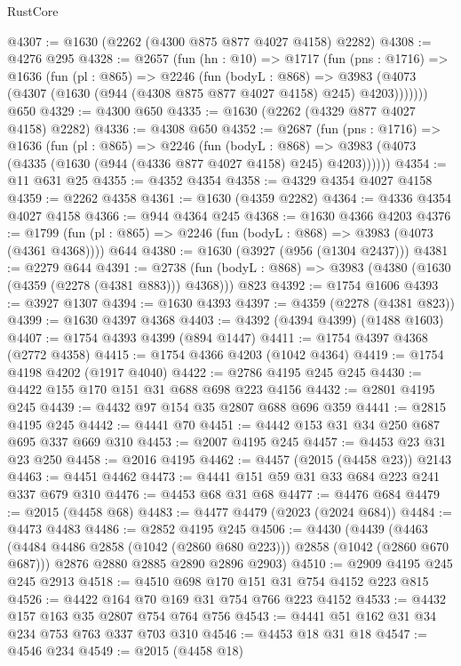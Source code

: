 \begin{lexlean}{RustCore}
\begin{coremodule}
@4307 := @1630 (@2262 (@4300 @875 @877 @4027 @4158) @2282)
@4308 := @4276 @295
@4328 := @2657
    (fun (hn : @10) =>
    @1717
      (fun (pns : @1716) =>
      @1636
        (fun (pl : @865) =>
        @2246
          (fun (bodyL : @868) =>
          @3983 (@4073 (@4307 (@1630 (@944 (@4308 @875 @877 @4027 @4158) @245) @4203)))))))
    @650
@4329 := @4300 @650
@4335 := @1630 (@2262 (@4329 @877 @4027 @4158) @2282)
@4336 := @4308 @650
@4352 := @2687
    (fun (pns : @1716) =>
    @1636
      (fun (pl : @865) =>
      @2246
        (fun (bodyL : @868) =>
        @3983 (@4073 (@4335 (@1630 (@944 (@4336 @877 @4027 @4158) @245) @4203))))))
@4354 := @11 @631 @25
@4355 := @4352 @4354
@4358 := @4329 @4354 @4027 @4158
@4359 := @2262 @4358
@4361 := @1630 (@4359 @2282)
@4364 := @4336 @4354 @4027 @4158
@4366 := @944 @4364 @245
@4368 := @1630 @4366 @4203
@4376 := @1799 (fun (pl : @865) => @2246 (fun (bodyL : @868) => @3983 (@4073 (@4361 @4368)))) @644
@4380 := @1630 (@3927 (@956 (@1304 @2437)))
@4381 := @2279 @644
@4391 := @2738 (fun (bodyL : @868) => @3983 (@4380 (@1630 (@4359 (@2278 (@4381 @883))) @4368))) @823
@4392 := @1754 @1606
@4393 := @3927 @1307
@4394 := @1630 @4393
@4397 := @4359 (@2278 (@4381 @823))
@4399 := @1630 @4397 @4368
@4403 := @4392 (@4394 @4399) (@1488 @1603)
@4407 := @1754 @4393 @4399 (@894 @1447)
@4411 := @1754 @4397 @4368 (@2772 @4358)
@4415 := @1754 @4366 @4203 (@1042 @4364)
@4419 := @1754 @4198 @4202 (@1917 @4040)
@4422 := @2786 @4195 @245 @245
@4430 := @4422 @155 @170 @151 @31 @688 @698 @223 @4156
@4432 := @2801 @4195 @245
@4439 := @4432 @97 @154 @35 @2807 @688 @696 @359
@4441 := @2815 @4195 @245
@4442 := @4441 @70
@4451 := @4442 @153 @31 @34 @250 @687 @695 @337 @669 @310
@4453 := @2007 @4195 @245
@4457 := @4453 @23 @31 @23 @250
@4458 := @2016 @4195
@4462 := @4457 (@2015 (@4458 @23)) @2143
@4463 := @4451 @4462
@4473 := @4441 @151 @59 @31 @33 @684 @223 @241 @337 @679 @310
@4476 := @4453 @68 @31 @68
@4477 := @4476 @684
@4479 := @2015 (@4458 @68)
@4483 := @4477 @4479 (@2023 (@2024 @684))
@4484 := @4473 @4483
@4486 := @2852 @4195 @245
@4506 := @4430
    (@4439
      (@4463 (@4484 @4486 @2858 (@1042 (@2860 @680 @223))) @2858 (@1042 (@2860 @670 @687)))
      @2876
      @2880
      @2885
      @2890
      @2896
      @2903)
@4510 := @2909 @4195 @245 @245 @2913
@4518 := @4510 @698 @170 @151 @31 @754 @4152 @223 @815
@4526 := @4422 @164 @70 @169 @31 @754 @766 @223 @4152
@4533 := @4432 @157 @163 @35 @2807 @754 @764 @756
@4543 := @4441 @51 @162 @31 @34 @234 @753 @763 @337 @703 @310
@4546 := @4453 @18 @31 @18
@4547 := @4546 @234
@4549 := @2015 (@4458 @18)

\end{coremodule}
\end{lexlean}
